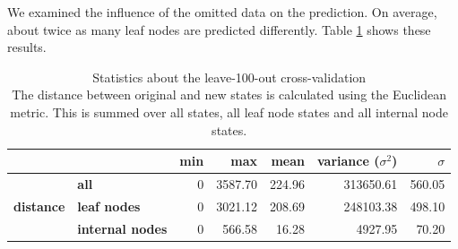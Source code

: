       We examined the influence of the omitted data on the prediction. On average, about twice as many 
        leaf nodes are predicted differently. %
        Table \ref{table:statistics cross-validation} shows these results. \\
      \begin{table}[h!]
        \begin{center}
          \begin{tabular}{ |cl||r|r|r|r|r| }
            \hline
            & & \bfseries min & \bfseries max & \bfseries mean & \bfseries variance ($\sigma^2$) & $\sigma$ \\
            \hline \hline
            \multirow{3}{*}{\bfseries distance} & \bfseries all     & 0 & 3587.70 & 224.96 & 313650.61 & 560.05 \\
            & \bfseries leaf nodes                                  & 0 & 3021.12 & 208.69 & 248103.38 & 498.10 \\
            & \bfseries internal nodes                              & 0 & 566.58 & 16.28 & 4927.95 & 70.20 \\ \hline
          \end{tabular}
        \end{center}
        \caption{Statistics about the leave-100-out cross-validation \\
          The distance between original and new states is calculated using the Euclidean metric. This 
            is summed over all states, all leaf node states and all internal node states.}
        \label{table:statistics cross-validation}
      \end{table}

